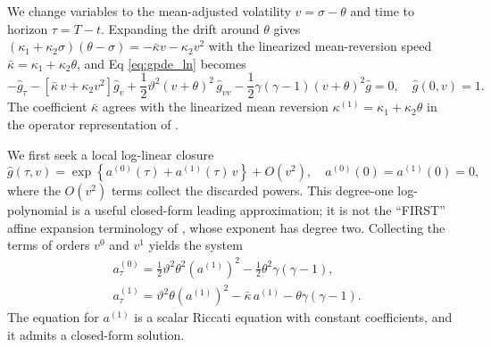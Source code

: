 \documentclass[11pt]{article}
\theoremstyle{remark}
\begin{document}
We change variables to the mean-adjusted volatility $v=\sigma - \theta$ and time to horizon $\tau=T-t$. Expanding the drift around $\theta$ gives $(\kappa_1+\kappa_2\sigma)(\theta-\sigma) = -\bar\kappa v - \kappa_2 v^{2}$ with the linearized mean-reversion speed $\bar\kappa = \kappa_{1}+\kappa_{2}\theta$, and Eq \eqref{eq:gpde_ln} becomes
\begin{equation}\label{eq:gpde_v}
- \hat{g}_{\tau} -   \left[\bar\kappa\, v + \kappa_2 v^{2}\right]\hat{g}_{v} +\frac{1}{2} \vartheta^{2} (v+\theta)^{2}\, \hat{g}_{vv} - \frac{1}{2} \gamma (\gamma-1) (v+\theta)^{2} \hat{g}  = 0, \quad \hat{g}(0, v) = 1.
\end{equation}
The coefficient $\bar\kappa$ agrees with the linearized mean reversion $\kappa^{(1)} = \kappa_{1}+\kappa_{2}\theta$ in the operator representation of \cite{SeppRakhmonov2024}.

We first seek a local log-linear closure
\begin{equation}\label{eq:affine}
\hat{g}(\tau, v) = \exp \left\{ a^{(0)}(\tau) + a^{(1)}(\tau)\, v \right\} + O(v^{2}), \quad a^{(0)}(0)=a^{(1)}(0)=0,
\end{equation}
where the $O(v^{2})$ terms collect the discarded powers. This degree-one log-polynomial is a useful closed-form leading approximation; it is not the ``FIRST'' affine expansion terminology of \cite{SeppRakhmonov2024}, whose exponent has degree two. Collecting the terms of orders $v^{0}$ and $v^{1}$ yields the system
\begin{equation}\label{eq:odes}
\begin{split}
& a^{(0)}_{\tau}  = \frac{1}{2} \vartheta^{2} \theta^{2} \left(a^{(1)}\right)^{2} - \frac{1}{2} \theta^{2}  \gamma (\gamma-1),\\
&  a^{(1)}_{\tau}  =  \vartheta^{2} \theta \left(a^{(1)}\right)^{2} -\bar\kappa\,  a^{(1)}  - \theta \gamma (\gamma-1).
\end{split}
\end{equation}
The equation for $a^{(1)}$ is a scalar Riccati equation with constant coefficients, and it admits a closed-form solution.
\end{document}
